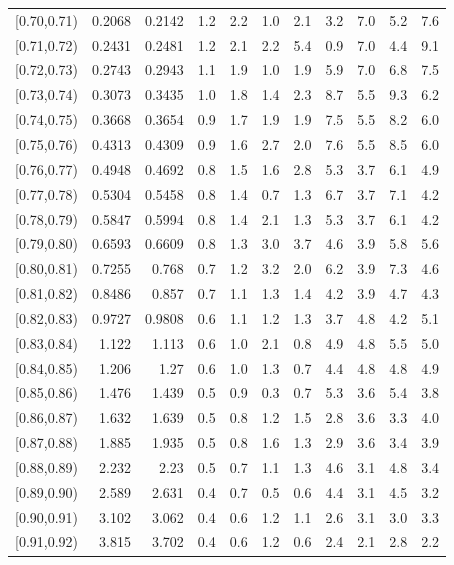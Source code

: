 \begin{table}[t!]
{\begin{tabular}{c  r r r r  r r r r  r r}
{[0.70,0.71)} & 0.2068 & 0.2142 & 1.2 & 2.2 & 1.0 & 2.1 & 3.2 & 7.0 & 5.2 & 7.6 \\
{[0.71,0.72)} & 0.2431 & 0.2481 & 1.2 & 2.1 & 2.2 & 5.4 & 0.9 & 7.0 & 4.4 & 9.1 \\
{[0.72,0.73)} & 0.2743 & 0.2943 & 1.1 & 1.9 & 1.0 & 1.9 & 5.9 & 7.0 & 6.8 & 7.5 \\
{[0.73,0.74)} & 0.3073 & 0.3435 & 1.0 & 1.8 & 1.4 & 2.3 & 8.7 & 5.5 & 9.3 & 6.2 \\
{[0.74,0.75)} & 0.3668 & 0.3654 & 0.9 & 1.7 & 1.9 & 1.9 & 7.5 & 5.5 & 8.2 & 6.0 \\
{[0.75,0.76)} & 0.4313 & 0.4309 & 0.9 & 1.6 & 2.7 & 2.0 & 7.6 & 5.5 & 8.5 & 6.0 \\
{[0.76,0.77)} & 0.4948 & 0.4692 & 0.8 & 1.5 & 1.6 & 2.8 & 5.3 & 3.7 & 6.1 & 4.9 \\
{[0.77,0.78)} & 0.5304 & 0.5458 & 0.8 & 1.4 & 0.7 & 1.3 & 6.7 & 3.7 & 7.1 & 4.2 \\
{[0.78,0.79)} & 0.5847 & 0.5994 & 0.8 & 1.4 & 2.1 & 1.3 & 5.3 & 3.7 & 6.1 & 4.2 \\
{[0.79,0.80)} & 0.6593 & 0.6609 & 0.8 & 1.3 & 3.0 & 3.7 & 4.6 & 3.9 & 5.8 & 5.6 \\
{[0.80,0.81)} & 0.7255 & 0.768 & 0.7 & 1.2 & 3.2 & 2.0 & 6.2 & 3.9 & 7.3 & 4.6 \\
{[0.81,0.82)} & 0.8486 & 0.857 & 0.7 & 1.1 & 1.3 & 1.4 & 4.2 & 3.9 & 4.7 & 4.3 \\
{[0.82,0.83)} & 0.9727 & 0.9808 & 0.6 & 1.1 & 1.2 & 1.3 & 3.7 & 4.8 & 4.2 & 5.1 \\
{[0.83,0.84)} & 1.122 & 1.113 & 0.6 & 1.0 & 2.1 & 0.8 & 4.9 & 4.8 & 5.5 & 5.0 \\
{[0.84,0.85)} & 1.206 & 1.27 & 0.6 & 1.0 & 1.3 & 0.7 & 4.4 & 4.8 & 4.8 & 4.9 \\
{[0.85,0.86)} & 1.476 & 1.439 & 0.5 & 0.9 & 0.3 & 0.7 & 5.3 & 3.6 & 5.4 & 3.8 \\
{[0.86,0.87)} & 1.632 & 1.639 & 0.5 & 0.8 & 1.2 & 1.5 & 2.8 & 3.6 & 3.3 & 4.0 \\
{[0.87,0.88)} & 1.885 & 1.935 & 0.5 & 0.8 & 1.6 & 1.3 & 2.9 & 3.6 & 3.4 & 3.9 \\
{[0.88,0.89)} & 2.232 & 2.23 & 0.5 & 0.7 & 1.1 & 1.3 & 4.6 & 3.1 & 4.8 & 3.4 \\
{[0.89,0.90)} & 2.589 & 2.631 & 0.4 & 0.7 & 0.5 & 0.6 & 4.4 & 3.1 & 4.5 & 3.2 \\
{[0.90,0.91)} & 3.102 & 3.062 & 0.4 & 0.6 & 1.2 & 1.1 & 2.6 & 3.1 & 3.0 & 3.3 \\
{[0.91,0.92)} & 3.815 & 3.702 & 0.4 & 0.6 & 1.2 & 0.6 & 2.4 & 2.1 & 2.8 & 2.2 \\

\end{tabular}}
\end{table}
